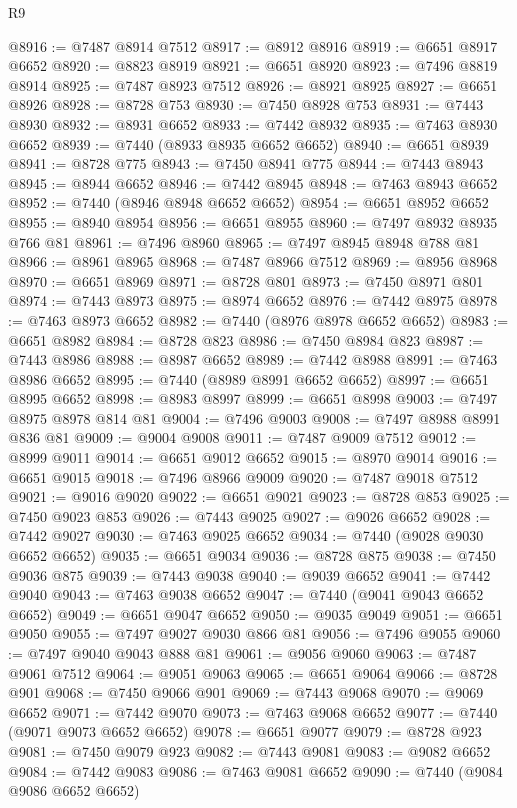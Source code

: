\begin{lexlean}{R9}
\begin{coremodule}
@8916 := @7487 @8914 @7512
@8917 := @8912 @8916
@8919 := @6651 @8917 @6652
@8920 := @8823 @8919
@8921 := @6651 @8920
@8923 := @7496 @8819 @8914
@8925 := @7487 @8923 @7512
@8926 := @8921 @8925
@8927 := @6651 @8926
@8928 := @8728 @753
@8930 := @7450 @8928 @753
@8931 := @7443 @8930
@8932 := @8931 @6652
@8933 := @7442 @8932
@8935 := @7463 @8930 @6652
@8939 := @7440 (@8933 @8935 @6652 @6652)
@8940 := @6651 @8939
@8941 := @8728 @775
@8943 := @7450 @8941 @775
@8944 := @7443 @8943
@8945 := @8944 @6652
@8946 := @7442 @8945
@8948 := @7463 @8943 @6652
@8952 := @7440 (@8946 @8948 @6652 @6652)
@8954 := @6651 @8952 @6652
@8955 := @8940 @8954
@8956 := @6651 @8955
@8960 := @7497 @8932 @8935 @766 @81
@8961 := @7496 @8960
@8965 := @7497 @8945 @8948 @788 @81
@8966 := @8961 @8965
@8968 := @7487 @8966 @7512
@8969 := @8956 @8968
@8970 := @6651 @8969
@8971 := @8728 @801
@8973 := @7450 @8971 @801
@8974 := @7443 @8973
@8975 := @8974 @6652
@8976 := @7442 @8975
@8978 := @7463 @8973 @6652
@8982 := @7440 (@8976 @8978 @6652 @6652)
@8983 := @6651 @8982
@8984 := @8728 @823
@8986 := @7450 @8984 @823
@8987 := @7443 @8986
@8988 := @8987 @6652
@8989 := @7442 @8988
@8991 := @7463 @8986 @6652
@8995 := @7440 (@8989 @8991 @6652 @6652)
@8997 := @6651 @8995 @6652
@8998 := @8983 @8997
@8999 := @6651 @8998
@9003 := @7497 @8975 @8978 @814 @81
@9004 := @7496 @9003
@9008 := @7497 @8988 @8991 @836 @81
@9009 := @9004 @9008
@9011 := @7487 @9009 @7512
@9012 := @8999 @9011
@9014 := @6651 @9012 @6652
@9015 := @8970 @9014
@9016 := @6651 @9015
@9018 := @7496 @8966 @9009
@9020 := @7487 @9018 @7512
@9021 := @9016 @9020
@9022 := @6651 @9021
@9023 := @8728 @853
@9025 := @7450 @9023 @853
@9026 := @7443 @9025
@9027 := @9026 @6652
@9028 := @7442 @9027
@9030 := @7463 @9025 @6652
@9034 := @7440 (@9028 @9030 @6652 @6652)
@9035 := @6651 @9034
@9036 := @8728 @875
@9038 := @7450 @9036 @875
@9039 := @7443 @9038
@9040 := @9039 @6652
@9041 := @7442 @9040
@9043 := @7463 @9038 @6652
@9047 := @7440 (@9041 @9043 @6652 @6652)
@9049 := @6651 @9047 @6652
@9050 := @9035 @9049
@9051 := @6651 @9050
@9055 := @7497 @9027 @9030 @866 @81
@9056 := @7496 @9055
@9060 := @7497 @9040 @9043 @888 @81
@9061 := @9056 @9060
@9063 := @7487 @9061 @7512
@9064 := @9051 @9063
@9065 := @6651 @9064
@9066 := @8728 @901
@9068 := @7450 @9066 @901
@9069 := @7443 @9068
@9070 := @9069 @6652
@9071 := @7442 @9070
@9073 := @7463 @9068 @6652
@9077 := @7440 (@9071 @9073 @6652 @6652)
@9078 := @6651 @9077
@9079 := @8728 @923
@9081 := @7450 @9079 @923
@9082 := @7443 @9081
@9083 := @9082 @6652
@9084 := @7442 @9083
@9086 := @7463 @9081 @6652
@9090 := @7440 (@9084 @9086 @6652 @6652)

\end{coremodule}
\end{lexlean}
